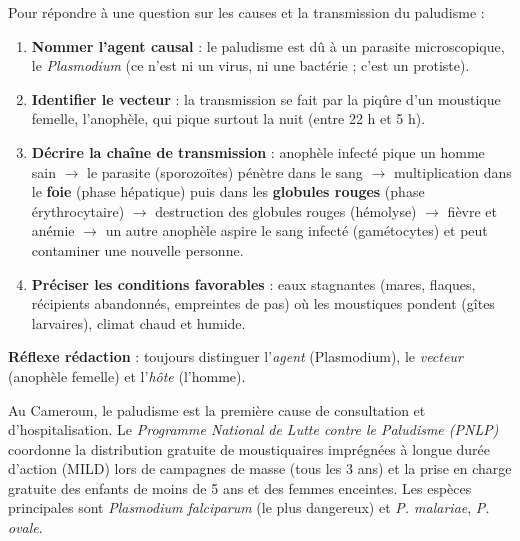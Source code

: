 \documentclass[11pt]{article}
\newcommand{\cle}[1]{{\popxbold\color{popdark}#1}}
\begin{document}
\begin{methode}
Pour répondre à une question sur les causes et la transmission du paludisme :
\begin{enumerate}
\item \textbf{Nommer l'agent causal} : le paludisme est dû à un \cle{parasite} microscopique, le \emph{Plasmodium} (ce n'est ni un virus, ni une bactérie ; c'est un protiste).
\item \textbf{Identifier le vecteur} : la transmission se fait par la piqûre d'un moustique femelle, l'\cle{anophèle}, qui pique surtout la nuit (entre 22 h et 5 h).
\item \textbf{Décrire la chaîne de transmission} : anophèle infecté pique un homme sain $\rightarrow$ le parasite (sporozoïtes) pénètre dans le sang $\rightarrow$ multiplication dans le \textbf{foie} (phase hépatique) puis dans les \textbf{globules rouges} (phase érythrocytaire) $\rightarrow$ destruction des globules rouges (hémolyse) $\rightarrow$ fièvre et anémie $\rightarrow$ un autre anophèle aspire le sang infecté (gamétocytes) et peut contaminer une nouvelle personne.
\item \textbf{Préciser les conditions favorables} : eaux stagnantes (mares, flaques, récipients abandonnés, empreintes de pas) où les moustiques pondent (gîtes larvaires), climat chaud et humide.
\end{enumerate}
\textbf{Réflexe rédaction} : toujours distinguer l'\emph{agent} (Plasmodium), le \emph{vecteur} (anophèle femelle) et l'\emph{hôte} (l'homme).
\end{methode}

\begin{savaistu}
Au Cameroun, le paludisme est la première cause de consultation et d'hospitalisation. Le \emph{Programme National de Lutte contre le Paludisme (PNLP)} coordonne la distribution gratuite de moustiquaires imprégnées à longue durée d'action (MILD) lors de campagnes de masse (tous les 3 ans) et la prise en charge gratuite des enfants de moins de 5 ans et des femmes enceintes. Les espèces principales sont \emph{Plasmodium falciparum} (le plus dangereux) et \emph{P. malariae}, \emph{P. ovale}.
\end{savaistu}
\end{document}
